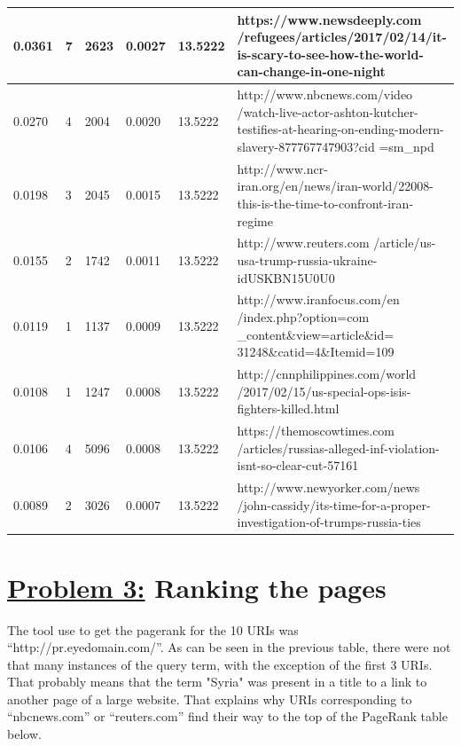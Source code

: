\documentclass{article}
\begin{document}
{\begin{tabular}{ |p{2cm}||p{2cm}|p{2cm}|p{2cm}| p{2cm}|p{6cm}| }
 0.0361   & 7      & 2623   &0.0027	&13.5222 	&  {  https://www.newsdeeply.com /refugees/articles/2017/02/14/it-is-scary-to-see-how-the-world-can-change-in-one-night  }  \\
\hline


 0.0270   & 4 	    & 2004   &0.0020	&13.5222	 &    { http://www.nbcnews.com/video /watch-live-actor-ashton-kutcher-testifies-at-hearing-on-ending-modern-slavery-877767747903?cid =sm\_npd  }  \\
\hline


 0.0198   &   3    & 2045   &0.0015	&13.5222	&   { http://www.ncr-iran.org/en/news/iran-world/22008-this-is-the-time-to-confront-iran-regime   }  \\
\hline

0.0155   & 2     & 1742    &0.0011	&13.5222	&       http://www.reuters.com /article/us-usa-trump-russia-ukraine-idUSKBN15U0U0   \\
\hline

 
0.0119   & 1     & 1137    &0.0009	&13.5222	&        http://www.iranfocus.com/en /index.php?option=com \_content\&view=article\&id= 31248\&catid=4\&Itemid=109  \\
\hline

 0.0108   & 1     & 1247    &0.0008	&13.5222	&        http://cnnphilippines.com/world /2017/02/15/us-special-ops-isis-fighters-killed.html   \\
\hline

 0.0106   & 4     & 5096    &0.0008	&13.5222	&         https://themoscowtimes.com /articles/russias-alleged-inf-violation-isnt-so-clear-cut-57161 \\
\hline

 0.0089   & 2     & 3026    &0.0007	&13.5222	&        http://www.newyorker.com/news /john-cassidy/its-time-for-a-proper-investigation-of-trumps-russia-ties  \\
\hline



 \hline
\end{tabular}
\newpage


\section*{{\underline{\huge {Problem 3:}} Ranking the pages}}
The tool use to get the pagerank for the 10 URIs was ``http://pr.eyedomain.com/''. As can be seen in the previous table, there were not that many instances of the query term, with the exception of the first 3 URIs. That probably means that the term "Syria" was present in a title to a link to another page of a large website. That explains why URIs corresponding to ``nbcnews.com'' or ``reuters.com'' find their way to the top of the PageRank table below. \\

}
\end{document}
